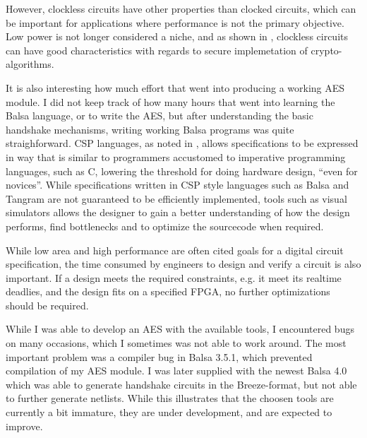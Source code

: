 However, clockless circuits have other properties than clocked
circuits, which can be important for applications where performance is
not the primary objective. Low power is not longer considered a niche,
and as shown in \cite{claes}, clockless circuits can have good
characteristics with regards to secure implemetation of
crypto-algorithms.

It is also interesting how much effort that went into producing a
working AES module. I did not keep track of how many hours that went
into learning the Balsa language, or to write the AES, but after
understanding the basic handshake mechanisms, writing working Balsa
programs was quite straighforward. CSP languages, as noted in
\cite{taylor}, allows specifications to be expressed in way that is
similar to programmers accustomed to imperative programming languages,
such as C, lowering the threshold for doing hardware design, ``even
for novices''. While specifications written in CSP style languages
such as Balsa and Tangram are not guaranteed to be efficiently
implemented, tools such as visual simulators allows the designer to
gain a better understanding of how the design performs, find
bottlenecks and to optimize the sourcecode when required.

While low area and high performance are often cited goals for a
digital circuit specification, the time consumed by engineers to
design and verify a circuit is also important. If a design meets the
required constraints, e.g. it meet its realtime deadlies, and the
design fits on a specified FPGA, no further optimizations should be
required.

While I was able to develop an AES with the available tools, I
encountered bugs on many occasions, which I sometimes was not able to
work around. The most important problem was a compiler bug in Balsa
3.5.1, which prevented compilation of my AES module. I was later
supplied with the newest Balsa 4.0 which was able to generate
handshake circuits in the Breeze-format, but not able to further
generate netlists. While this illustrates that the choosen tools are
currently a bit immature, they are under development, and are expected
to improve.

